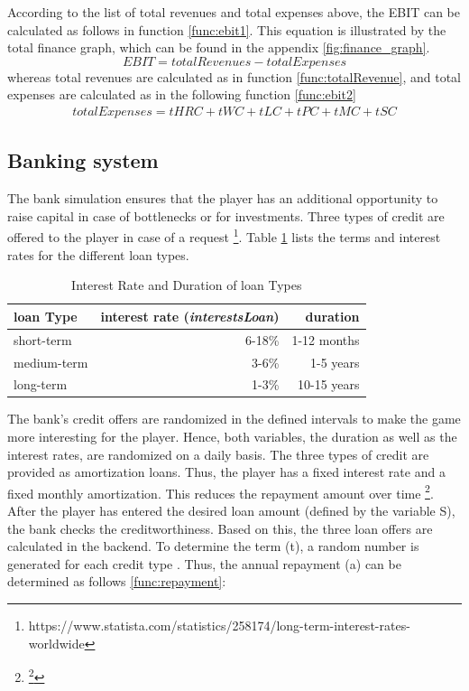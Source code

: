 According to the list of total revenues and total expenses above, the EBIT can be calculated as follows in function \ref{func:ebit1}. This equation is illustrated by the total finance graph, which can be found in the appendix \ref{fig:finance_graph}. %
\begin{equation}
\label{func:ebit1}
    EBIT = totalRevenues - totalExpenses
\end{equation}
whereas total revenues are calculated as in function \ref{func:totalRevenue}, and total expenses are calculated as in the following function \ref{func:ebit2}
\begin{equation}
    \label{func:ebit2}
    \begin{aligned}
       totalExpenses = tHRC + tWC + tLC + tPC + tMC + tSC
    \end{aligned}
\end{equation}

\subsection{Banking system}
\label{sec: banking}

The bank simulation ensures that the player has an additional opportunity to raise capital in case of bottlenecks or for investments. Three types of credit are offered to the player in case of a request \footnote{https://www.statista.com/statistics/258174/long-term-interest-rates-worldwide}. Table \ref{loan_types} lists the terms and interest rates for the different loan types. 

\begin{table}[ht]
\centering
\begin{tabular}{|l|r|r|}
\hline
loan Type       & interest rate (\textit{interestsLoan})     & duration \\ \hline
short-term      & 6-18\%           & 1-12 months    \\
medium-term     & 3-6\%            & 1-5 years     \\
long-term       & 1-3\%             & 10-15 years     \\
\hline
\end{tabular}
\caption{Interest Rate and Duration of loan Types}
\label{loan_types}
\end{table}

The bank's credit offers are randomized in the defined intervals to make the game more interesting for the player. Hence, both variables, the duration as well as the interest rates, are randomized on a daily basis. The three types of credit are provided as amortization loans. Thus, the player has a fixed interest rate and a fixed monthly amortization. This reduces the repayment amount over time \footnote{\footnote{https://www.investopedia.com/terms/a/amortized\_loan.asp}}.
After the player has entered the desired loan amount (defined by the variable \gls{S}), the bank checks the creditworthiness. Based on this, the three loan offers are calculated in the backend. To determine the term (\gls{t}), a random number is generated for each credit type . Thus, the annual repayment (\gls{a}) can be determined as follows \ref{func:repayment}:

